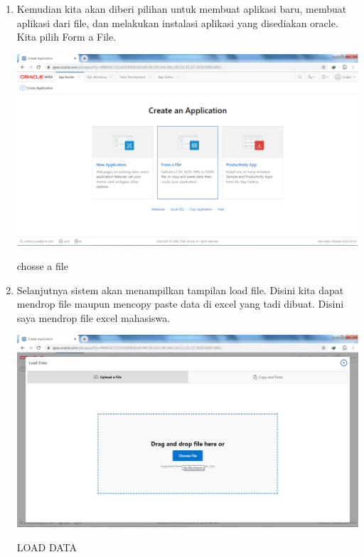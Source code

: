 \documentclass{article}
\begin{document}
\begin{enumerate}
      \item Kemudian kita akan diberi pilihan untuk membuat aplikasi baru, membuat aplikasi dari file, dan melakukan instalasi aplikasi yang disediakan oracle. Kita pilih Form a File.
    \begin{center}
         \centering
            \includegraphics[scale=0.27]{figures/DB2.png}
        \caption{chosse a file}
        \label{from}
    \end{center}
    
    \item Selanjutnya sistem akan menampilkan tampilan load file. Disini kita dapat mendrop file maupun mencopy paste data di excel yang tadi dibuat. Disini saya mendrop file excel mahasiswa. 
    \begin{center}
         \centering
            \includegraphics[scale=0.27]{figures/DB3.png}
        \caption{LOAD DATA}
        \label{chosse}
    \end{center}
    

\end{enumerate}
\end{document}
